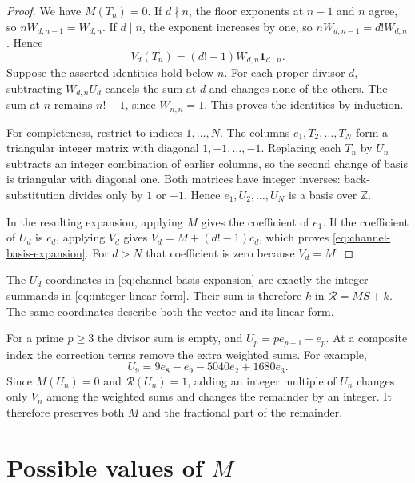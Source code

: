 \documentclass[11pt]{article}
\begin{document}
\begin{proof}
We have $M(T_n)=0$. If $d\nmid n$, the floor exponents at
$n-1$ and $n$ agree, so $nW_{d,n-1}=W_{d,n}$. If $d\mid n$, the
exponent increases by one, so $nW_{d,n-1}=d!W_{d,n}$. Hence
\[
 V_d(T_n)=(d!-1)W_{d,n}\mathbf1_{d\mid n}.
\]
Suppose the asserted identities hold below $n$. For each proper divisor
$d$, subtracting $W_{d,n}U_d$ cancels the sum at $d$ and changes none
of the others. The sum at $n$ remains $n!-1$, since $W_{n,n}=1$.
This proves the identities by induction.

For completeness, restrict to indices $1,\ldots,N$. The columns
$e_1,T_2,\ldots,T_N$ form a triangular integer matrix with diagonal
$1,-1,\ldots,-1$. Replacing each $T_n$ by $U_n$ subtracts an integer
combination of earlier columns, so the second change of basis is
triangular with diagonal one. Both matrices have integer inverses:
back-substitution divides only by $1$ or $-1$. Hence
$e_1,U_2,\ldots,U_N$ is a basis over $\mathbb Z$.

In the resulting expansion, applying $M$ gives the coefficient of $e_1$.
If the coefficient of $U_d$ is $c_d$, applying $V_d$ gives
$V_d=M+(d!-1)c_d$, which proves \eqref{eq:channel-basis-expansion}. For $d>N$ that
coefficient is zero because $V_d=M$.
\end{proof}

The $U_d$-coordinates in \eqref{eq:channel-basis-expansion} are exactly
the integer summands in \eqref{eq:integer-linear-form}. Their sum is
therefore $k$ in $\mathcal R=MS+k$. The same coordinates describe
both the vector and its linear form.

For a prime $p\ge3$ the divisor sum is empty, and
$U_p=pe_{p-1}-e_p$. At a composite index the correction terms remove
the extra weighted sums. For example,
\begin{equation}
 U_9=9e_8-e_9-5040e_2+1680e_3.
 \label{res:translator}
\end{equation}
Since $M(U_n)=0$ and $\mathcal R(U_n)=1$, adding an integer multiple
of $U_n$ changes only $V_n$ among the weighted sums and changes the
remainder by an integer. It therefore preserves both $M$ and the
fractional part of the remainder.

\section{Possible values of \texorpdfstring{$M$}{M}}\label{sec:moments}
\end{document}
